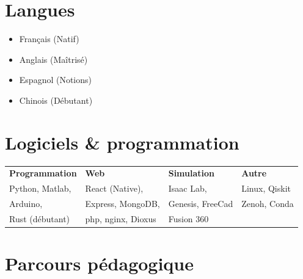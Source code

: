 \documentclass[a4paper,11pt]{article}
\begin{document}
\begin{minipage}[t]{0.23\textwidth}
    \section*{Langues}
    \begin{itemize}[leftmargin=*,noitemsep]
        \item Français (Natif)
        \item Anglais (Maîtrisé)
        \item Espagnol (Notions)
        \item Chinois (Débutant)
    \end{itemize}
\end{minipage}
\hfill
\begin{minipage}[t]{0.70\textwidth}
    \section*{Logiciels \& programmation}
\vspace{-5pt}
\begin{tabular}{@{}llll@{}}
\textbf{Programmation} & \textbf{Web} & \textbf{Simulation} & \textbf{Autre}\\
Python, Matlab, & React (Native), & Isaac Lab,& Linux, Qiskit\\
Arduino, & Express, MongoDB, & Genesis, FreeCad & Zenoh, Conda \\
Rust (débutant) & php, nginx, Dioxus & Fusion 360 & \\
\end{tabular}
\vspace{-5pt}

\end{minipage}


\section*{Parcours pédagogique}
\end{document}

